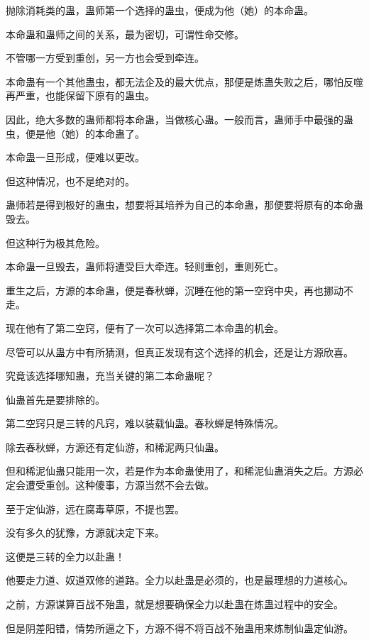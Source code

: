 
\begin{this_body}



抛除消耗类的蛊，蛊师第一个选择的蛊虫，便成为他（她）的本命蛊。

本命蛊和蛊师之间的关系，最为密切，可谓性命交修。

不管哪一方受到重创，另一方也会受到牵连。

本命蛊有一个其他蛊虫，都无法企及的最大优点，那便是炼蛊失败之后，哪怕反噬再严重，也能保留下原有的蛊虫。

因此，绝大多数的蛊师都将本命蛊，当做核心蛊。一般而言，蛊师手中最强的蛊虫，便是他（她）的本命蛊了。

本命蛊一旦形成，便难以更改。

但这种情况，也不是绝对的。

蛊师若是得到极好的蛊虫，想要将其培养为自己的本命蛊，那便要将原有的本命蛊毁去。

但这种行为极其危险。

本命蛊一旦毁去，蛊师将遭受巨大牵连。轻则重创，重则死亡。

重生之后，方源的本命蛊，便是春秋蝉，沉睡在他的第一空窍中央，再也挪动不走。

现在他有了第二空窍，便有了一次可以选择第二本命蛊的机会。

尽管可以从蛊方中有所猜测，但真正发现有这个选择的机会，还是让方源欣喜。

究竟该选择哪知蛊，充当关键的第二本命蛊呢？

仙蛊首先是要排除的。

第二空窍只是三转的凡窍，难以装载仙蛊。春秋蝉是特殊情况。

除去春秋蝉，方源还有定仙游，和稀泥两只仙蛊。

但和稀泥仙蛊只能用一次，若是作为本命蛊使用了，和稀泥仙蛊消失之后。方源必定会遭受重创。这种傻事，方源当然不会去做。

至于定仙游，远在腐毒草原，不提也罢。

没有多久的犹豫，方源就决定下来。

这便是三转的全力以赴蛊！

他要走力道、奴道双修的道路。全力以赴蛊是必须的，也是最理想的力道核心。

之前，方源谋算百战不殆蛊，就是想要确保全力以赴蛊在炼蛊过程中的安全。

但是阴差阳错，情势所逼之下，方源不得不将百战不殆蛊用来炼制仙蛊定仙游。


\end{this_body}
